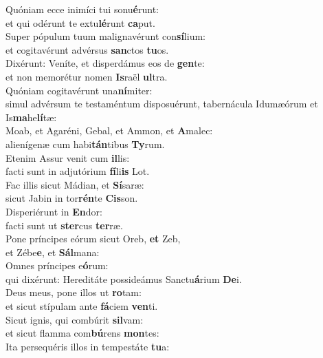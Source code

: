 \evenverse Quóniam ecce inimíci tui sonu\textbf{é}runt:~\*\\
\evenverse et qui odérunt te extu\textbf{lé}runt \textbf{ca}put.\\
\oddverse Super pópulum tuum malignavérunt con\textbf{sí}lium:~\*\\
\oddverse et cogitavérunt advérsus \textbf{san}ctos \textbf{tu}os.\\
\evenverse Dixérunt: Veníte, et disperdámus eos de \textbf{gen}te:~\*\\
\evenverse et non memorétur nomen \textbf{Is}raël \textbf{ul}tra.\\
\oddverse Quóniam cogitavérunt una\textbf{ní}miter:~\*\\
\oddverse simul advérsum te testaméntum disposuérunt, tabernácula Idumæórum et Is\textbf{ma}he\textbf{lí}tæ:\\
\evenverse Moab, et Agaréni, Gebal, et Ammon, et \textbf{A}malec:~\*\\
\evenverse alienígenæ cum habi\textbf{tán}tibus \textbf{Ty}rum.\\
\oddverse Etenim Assur venit cum \textbf{il}lis:~\*\\
\oddverse facti sunt in adjutórium \textbf{fí}li\textbf{is} Lot.\\
\evenverse Fac illis sicut Mádian, et \textbf{Sí}saræ:~\*\\
\evenverse sicut Jabin in tor\textbf{rén}te \textbf{Cis}son.\\
\oddverse Disperiérunt in \textbf{En}dor:~\*\\
\oddverse facti sunt ut \textbf{ster}cus \textbf{ter}ræ.\\
\evenverse Pone príncipes eórum sicut Oreb, \textbf{et} Zeb,~\*\\
\evenverse et Zébe\textbf{e}, et \textbf{Sál}mana:\\
\oddverse Omnes príncipes e\textbf{ó}rum:~\*\\
\oddverse qui dixérunt: Hereditáte possideámus Sanctu\textbf{á}rium \textbf{De}i.\\
\evenverse Deus meus, pone illos ut \textbf{ro}tam:~\*\\
\evenverse et sicut stípulam ante \textbf{fá}ciem \textbf{ven}ti.\\
\oddverse Sicut ignis, qui combúrit \textbf{sil}vam:~\*\\
\oddverse et sicut flamma com\textbf{bú}rens \textbf{mon}tes:\\
\evenverse Ita persequéris illos in tempestáte \textbf{tu}a:~\*\\
